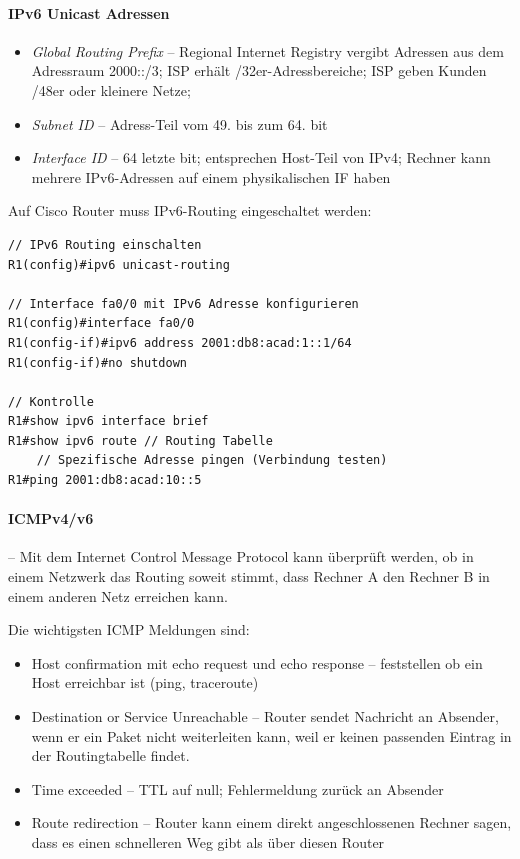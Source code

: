 \documentclass[a4paper,12pt]{article}
\begin{document}
\paragraph{IPv6 Unicast Adressen}
\begin{itemize}
\item \emph{Global Routing Prefix} -- Regional Internet Registry vergibt Adressen aus dem Adressraum 2000::/3; ISP erhält /32er-Adressbereiche; ISP geben Kunden /48er oder kleinere Netze;
\item \emph{Subnet ID} -- Adress-Teil vom 49. bis zum 64. bit
\item \emph{Interface ID} -- 64 letzte bit; entsprechen Host-Teil von IPv4; Rechner kann mehrere IPv6-Adressen auf einem physikalischen IF haben
\end{itemize}

Auf Cisco Router muss IPv6-Routing eingeschaltet werden:
\begin{lstlisting}
// IPv6 Routing einschalten
R1(config)#ipv6 unicast-routing 

// Interface fa0/0 mit IPv6 Adresse konfigurieren
R1(config)#interface fa0/0
R1(config-if)#ipv6 address 2001:db8:acad:1::1/64
R1(config-if)#no shutdown

// Kontrolle
R1#show ipv6 interface brief
R1#show ipv6 route // Routing Tabelle
    // Spezifische Adresse pingen (Verbindung testen)
R1#ping 2001:db8:acad:10::5
\end{lstlisting}

\paragraph{ICMPv4/v6} -- Mit dem Internet Control Message Protocol kann überprüft werden, ob in einem Netzwerk das Routing soweit stimmt, dass Rechner A den Rechner B in einem anderen Netz erreichen kann.

Die wichtigsten ICMP Meldungen sind:
\begin{itemize}
\item Host confirmation mit echo request und echo response -- feststellen ob ein Host erreichbar ist (ping, traceroute)
\item Destination or Service Unreachable -- Router sendet Nachricht an Absender, wenn er ein Paket nicht weiterleiten kann, weil er keinen passenden Eintrag in der Routingtabelle findet.
\item Time exceeded -- TTL auf null; Fehlermeldung zurück an Absender
\item Route redirection -- Router kann einem direkt angeschlossenen Rechner sagen, dass es einen schnelleren Weg gibt als über diesen Router
\end{itemize}
\end{document}

